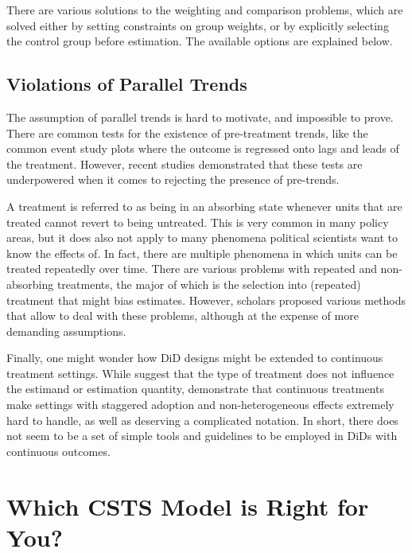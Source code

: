 \documentclass[hidelinks]{article}\usepackage[]{graphicx}\usepackage[]{color}
\begin{document}
There are various solutions to the weighting and comparison problems, which are solved either by setting constraints on group weights, or by explicitly selecting the control group before estimation. The available options are explained below.

\subsection{Violations of Parallel Trends}

The assumption of parallel trends is hard to motivate, and impossible to prove. There are common tests for the existence of pre-treatment trends, like the common event study plots where the outcome is regressed onto lags and leads of the treatment. However, recent studies demonstrated that these tests are underpowered when it comes to rejecting the presence of pre-trends.




A treatment is referred to as being in an absorbing state whenever units that are treated cannot revert to being untreated. This is very common in many policy areas, but it does also not apply to many phenomena political scientists want to know the effects of. In fact, there are multiple phenomena in which units can be treated repeatedly over time. There are various problems with repeated and non-absorbing treatments, the major of which is the selection into (repeated) treatment that might bias estimates. However, scholars proposed various methods that allow to deal with these problems, although at the expense of more demanding assumptions.

Finally, one might wonder how DiD designs might be extended to continuous treatment settings. While \textcite{Angrist2009} suggest that the type of treatment does not influence the estimand or estimation quantity, \textcite{Callaway2021} demonstrate that continuous treatments make settings with staggered adoption and non-heterogeneous effects extremely hard to handle, as well as deserving a complicated notation. In short, there does not seem to be a set of simple tools and guidelines to be employed in DiDs with continuous outcomes.

\section{Which CSTS Model is Right for You?}
\end{document}
